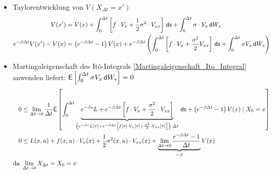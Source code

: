 \documentclass[a4paper, 12pt]{scrartcl}
\newcommand{\ds}{\thinspace \mathsf{ds}}
\newcommand{\dW}{\thinspace \mathsf{d}W}
\begin{document}
\begin{beweis}
\begin{itemize}
        \item[3.] Taylorentwicklung von $V(X_{\Delta t} = x')$
        \begin{align*}
            V(x') &= V(x) 
            + \int_0^{\Delta t}
            \left[
                f \cdot V_x + \frac{1}{2} \sigma^2 \cdot V_{xx}
            \right]
            \ds
            + \int_0^{\Delta t} \sigma \cdot V_x \dW_s
            \\
            e^{-\beta \Delta t} V(x') - V(x)
            &=
            \left(
                e^{-\beta \Delta t} - 1
            \right) V(x)
            + e^{-\beta \Delta t}
            \left(
                \int_0^{\Delta t}
                \left[
                    f \cdot V_x + \frac{\sigma^2}{2} V_{xx}
                \right]
                \ds
                +
                \int_0^{\Delta t} \sigma V_x \dW_s
            \right)
        \end{align*}
        \item[4.] Martingaleigenschaft des Itô-Integrals 
        \ref{Martingaleigenschaft_Ito_Integral} anwenden liefert:
        $\mathsf{E}\left[\int_{0}^{\Delta t} \sigma V_x \dW_s \right] = 0$
        \begin{align*}
            0 &\leq 
            \lim_{\Delta t \to 0}
            \frac{1}{\Delta t}
            \mathsf{E}
            \left[
                \int_0^{\Delta t} 
                \underbrace{
                    e^{-\beta s} L 
                    +
                    e^{-\beta \Delta t}
                    \left[
                        f \cdot V_x + \frac{\sigma^2}{2} \cdot V_{xx}
                    \right]
                }_{
                    \left(
                        e^{-\beta \tau} L[\tau] 
                        +
                        e^{-\beta \Delta t}
                        \left[
                            f[\tau] \cdot V_x[\tau] + \frac{\sigma^2}{2} \cdot V_{xx}[\tau]
                        \right]
                    \right) 
                    \cdot \Delta t                
                }
                \ds 
                +
                \left(
                    e^{-\beta \Delta t} - 1
                \right) V(x)
                \mid 
                X_0 = x
            \right]
            \\
            0 &\leq 
            L(x,u) + f(x,u) \cdot V_x(x) + \frac{1}{2} \sigma^2(x,u) \cdot V_{xx}(x) 
            + 
            \underbrace{
                \lim_{\Delta t \to 0}
                \frac{e^{-\beta \Delta t} - 1}{\Delta t} 
            }_{
                -\beta 
            }
            V(x)
            \\
            \text{da } &\lim_{\Delta t \to 0} X_{\Delta t} = X_0 = x
        \end{align*}


\end{itemize}
\end{beweis}
\end{document}
